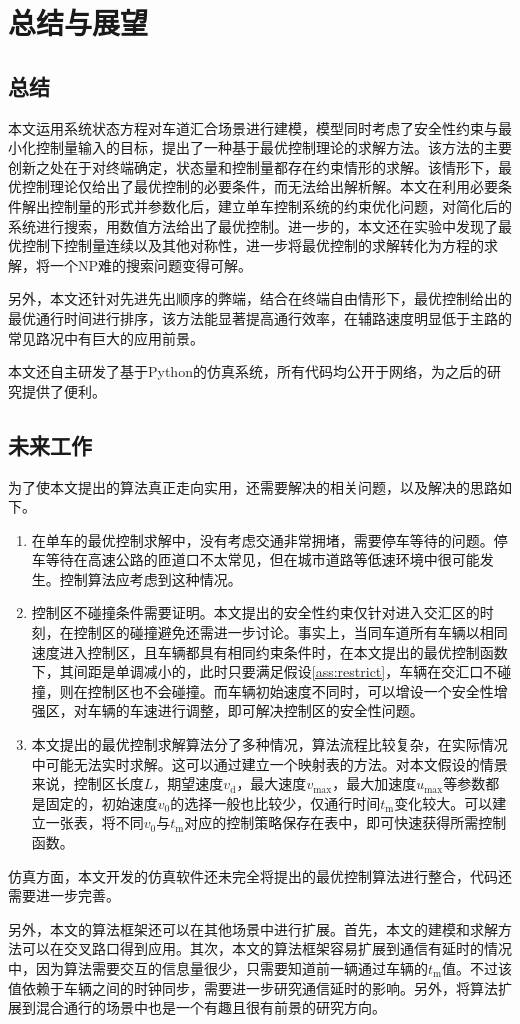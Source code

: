 \chapter{总结与展望}
\label{cha:sum}

\section{总结}
本文运用系统状态方程对车道汇合场景进行建模，模型同时考虑了安全性约束与最小化控制量输入的目标，提出了一种基于最优控制理论的求解方法。该方法的主要创新之处在于对终端确定，状态量和控制量都存在约束情形的求解。该情形下，最优控制理论仅给出了最优控制的必要条件，而无法给出解析解。本文在利用必要条件解出控制量的形式并参数化后，建立单车控制系统的约束优化问题，对简化后的系统进行搜索，用数值方法给出了最优控制。进一步的，本文还在实验中发现了最优控制下控制量连续以及其他对称性，进一步将最优控制的求解转化为方程的求解，将一个NP难的搜索问题变得可解。

另外，本文还针对先进先出顺序的弊端，结合在终端自由情形下，最优控制给出的最优通行时间进行排序，该方法能显著提高通行效率，在辅路速度明显低于主路的常见路况中有巨大的应用前景。

本文还自主研发了基于{\ttfamily Python}的仿真系统，所有代码均公开于网络，为之后的研究提供了便利。

\section{未来工作}
为了使本文提出的算法真正走向实用，还需要解决的相关问题，以及解决的思路如下。
\begin{enumerate}[label=(\arabic*), wide=\parindent]
\item 在单车的最优控制求解中，没有考虑交通非常拥堵，需要停车等待的问题。停车等待在高速公路的匝道口不太常见，但在城市道路等低速环境中很可能发生。控制算法应考虑到这种情况。
\item 控制区不碰撞条件需要证明。本文提出的安全性约束仅针对进入交汇区的时刻，在控制区的碰撞避免还需进一步讨论。事实上，当同车道所有车辆以相同速度进入控制区，且车辆都具有相同约束条件时，在本文提出的最优控制函数下，其间距是单调减小的，此时只要满足假设\ref{ass:restrict}，车辆在交汇口不碰撞，则在控制区也不会碰撞。而车辆初始速度不同时，可以增设一个安全性增强区，对车辆的车速进行调整，即可解决控制区的安全性问题。
\item 本文提出的最优控制求解算法分了多种情况，算法流程比较复杂，在实际情况中可能无法实时求解。这可以通过建立一个映射表的方法。对本文假设的情景来说，控制区长度$L$，期望速度$v_\mathrm{d}$，最大速度$v_{\max}$，最大加速度$u_{\max}$等参数都是固定的，初始速度$v_0$的选择一般也比较少，仅通行时间$t_\mathrm{m}$变化较大。可以建立一张表，将不同$v_0$与$t_\mathrm{m}$对应的控制策略保存在表中，即可快速获得所需控制函数。
\end{enumerate}

仿真方面，本文开发的仿真软件还未完全将提出的最优控制算法进行整合，代码还需要进一步完善。

另外，本文的算法框架还可以在其他场景中进行扩展。首先，本文的建模和求解方法可以在交叉路口得到应用。其次，本文的算法框架容易扩展到通信有延时的情况中，因为算法需要交互的信息量很少，只需要知道前一辆通过车辆的$t_\mathrm{m}$值。不过该值依赖于车辆之间的时钟同步，需要进一步研究通信延时的影响。另外，将算法扩展到混合通行的场景中也是一个有趣且很有前景的研究方向。